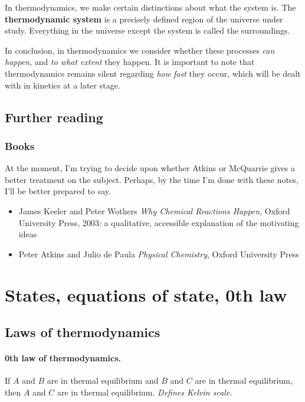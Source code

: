 \documentclass{article}
\numberwithin{theorem}{section}
\numberwithin{corollary}{section}
\numberwithin{postulate}{section}
\numberwithin{lemma}{section}
\numberwithin{definition}{section}
\begin{document}
In thermodynamics, we make certain distinctions about what the system is. The
\textbf{thermodynamic system} is a precisely defined region of the universe
under study. Everything in the universe except the system is called the
surroundings.

In conclusion, in thermodynamics we consider whether these processes \textit{can
happen}, and \textit{to what extent} they happen. It is important to note that
thermodynamics remains silent regarding \textit{how fast} they occur, which will
be dealt with in kinetics at a later stage.

\subsection{Further reading}

\subsubsection{Books}
At the moment, I'm trying to decide upon whether Atkins or McQuarrie gives a
better treatment on the subject. Perhaps, by the time I'm done with these notes,
I'll be better prepared to say.

\begin{itemize}

  \item James Keeler and Peter Wothers \textit{Why Chemical Reactions Happen},
    Oxford University Press, 2003: a qualitative, accessible explanation of the
    motivating ideas

  \item Peter Atkins and Julio de Paula \textit{Physical Chemistry}, Oxford
    University Press
\end{itemize}

\setcounter{section}{0}
\section{States, equations of state, 0th law}

\subsection{Laws of thermodynamics}

\paragraph{0th law of thermodynamics.} If $A$ and $B$ are in thermal equilibrium
and $B$ and $C$ are in thermal equilibrium, then $A$ and $C$ are in thermal 
equilibrium. \textit{Defines Kelvin scale.}
\end{document}
